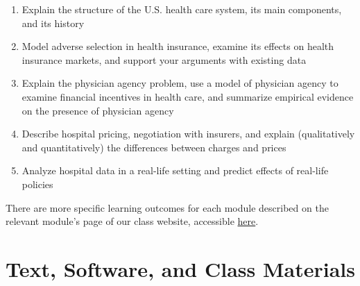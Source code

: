\documentclass[11pt,]{article}
\begin{document}
\begin{enumerate}
\def\labelenumi{\arabic{enumi}.}
\item
  Explain the structure of the U.S. health care system, its main
  components, and its history
\item
  Model adverse selection in health insurance, examine its effects on
  health insurance markets, and support your arguments with existing
  data
\item
  Explain the physician agency problem, use a model of physician agency
  to examine financial incentives in health care, and summarize
  empirical evidence on the presence of physician agency
\item
  Describe hospital pricing, negotiation with insurers, and explain
  (qualitatively and quantitatively) the differences between charges and
  prices
\item
  Analyze hospital data in a real-life setting and predict effects of
  real-life policies
\end{enumerate}

There are more specific learning outcomes for each module described on
the relevant module's page of our class website, accessible
\href{https://econ372s21.classes.ianmccarthyecon.com/}{here}.

\hypertarget{text-software-and-class-materials}{%
\section{Text, Software, and Class
Materials}\label{text-software-and-class-materials}}
\end{document}

